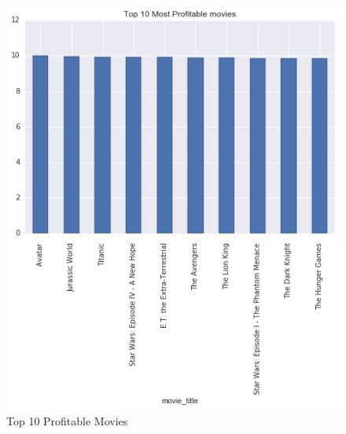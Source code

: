 \documentclass{article}%
\begin{document}
\begin{figure}
\centering
\includegraphics[width=1.0\columnwidth]{Fig/TOP10MostProfitableMovies.png}
\caption{Top 10 Profitable Movies}
\label{fig:TOP10MostProfitableMovies}
\end{figure}
\end{document}
